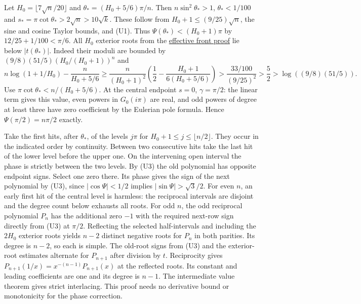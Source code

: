 Let $H_0=\lfloor7\sqrt n/20\rfloor$ and $\theta_*=(H_0+5/6)\pi/n$. Then $n\sin^2\theta_*>1$, $\theta_*<1/100$ and $s_*=\pi\cot\theta_*>2\sqrt n>10\sqrt k$. These follow from $H_0+1\le(9/25)\sqrt n$, the sine and cosine Taylor bounds, and (U1). Thus $\Psi(\theta_*)<(H_0+1)\pi$ by $12/25+1/100<\pi/6$. All $H_0$ exterior roots from the \href{https://github.com/ProgramComputer/open-math-research/blob/main/topics/long-cycle-excedances/effective-front.md}{effective front proof} lie below $|t(\theta_*)|$. Indeed their moduli are bounded by $(9/8)(51/5)(H_0/(H_0+1))^n$ and
\[
n\log(1+1/H_0)-\frac n{H_0+5/6}
\ge \frac n{(H_0+1)^2}\left(\frac12-\frac{H_0+1}{6(H_0+5/6)}\right)
>\frac{33/100}{(9/25)^2}>\frac52>\log((9/8)(51/5)).
\]
Use $\pi\cot\theta_*<n/(H_0+5/6)$. At the central endpoint $s=0$, $\gamma=\pi/2$: the linear term gives this value, even powers in $G_0(i\pi)$ are real, and odd powers of degree at least three have zero coefficient by the Eulerian pole formula. Hence $\Psi(\pi/2)=n\pi/2$ exactly.

Take the first hits, after $\theta_*$, of the levels $j\pi$ for $H_0+1\le j\le\lfloor n/2\rfloor$. They occur in the indicated order by continuity. Between two consecutive hits take the last hit of the lower level before the upper one. On the intervening open interval the phase is strictly between the two levels. By (U3) the old polynomial has opposite endpoint signs. Select one zero there. Its phase gives the sign of the next polynomial by (U3), since $|\cos\Psi|<1/2$ implies $|\sin\Psi|>\sqrt3/2$. For even $n$, an early first hit of the central level is harmless: the reciprocal intervals are disjoint and the degree count below exhausts all roots. For odd $n$, the odd reciprocal polynomial $P_n$ has the additional zero $-1$ with the required next-row sign directly from (U3) at $\pi/2$. Reflecting the selected half-intervals and including the $2H_0$ exterior roots yields $n-2$ distinct negative roots for $P_n$ in both parities. Its degree is $n-2$, so each is simple. The old-root signs from (U3) and the exterior-root estimates alternate for $P_{n+1}$ after division by $t$. Reciprocity gives $P_{n+1}(1/x)=x^{-(n-1)}P_{n+1}(x)$ at the reflected roots. Its constant and leading coefficients are one and its degree is $n-1$. The intermediate value theorem gives strict interlacing. This proof needs no derivative bound or monotonicity for the phase correction.
